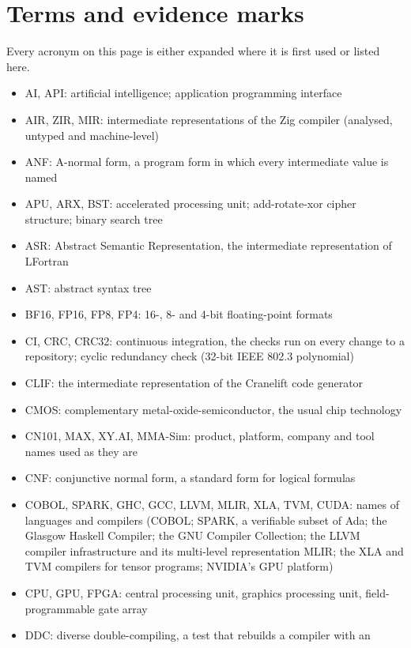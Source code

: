 \documentclass[10pt,letterpaper]{article}
\providecommand{\tightlist}{\setlength{\itemsep}{1pt}\setlength{\parskip}{0pt}}
\begin{document}
\section{Terms and evidence marks}\label{terms-and-evidence-marks}

Every acronym on this page is either expanded where it is first used or
listed here.

\begin{itemize}
\tightlist
\item
  AI, API: artificial intelligence; application programming interface
\item
  AIR, ZIR, MIR: intermediate representations of the Zig compiler
  (analysed, untyped and machine-level)
\item
  ANF: A-normal form, a program form in which every intermediate value
  is named
\item
  APU, ARX, BST: accelerated processing unit; add-rotate-xor cipher
  structure; binary search tree
\item
  ASR: Abstract Semantic Representation, the intermediate representation
  of LFortran
\item
  AST: abstract syntax tree
\item
  BF16, FP16, FP8, FP4: 16-, 8- and 4-bit floating-point formats
\item
  CI, CRC, CRC32: continuous integration, the checks run on every change
  to a repository; cyclic redundancy check (32-bit IEEE 802.3
  polynomial)
\item
  CLIF: the intermediate representation of the Cranelift code generator
\item
  CMOS: complementary metal-oxide-semiconductor, the usual chip
  technology
\item
  CN101, MAX, XY.AI, MMA-Sim: product, platform, company and tool names
  used as they are
\item
  CNF: conjunctive normal form, a standard form for logical formulas
\item
  COBOL, SPARK, GHC, GCC, LLVM, MLIR, XLA, TVM, CUDA: names of languages
  and compilers (COBOL; SPARK, a verifiable subset of Ada; the Glasgow
  Haskell Compiler; the GNU Compiler Collection; the LLVM compiler
  infrastructure and its multi-level representation MLIR; the XLA and
  TVM compilers for tensor programs; NVIDIA's GPU platform)
\item
  CPU, GPU, FPGA: central processing unit, graphics processing unit,
  field-programmable gate array
\item
  DDC: diverse double-compiling, a test that rebuilds a compiler with an

\end{itemize}
\end{document}
